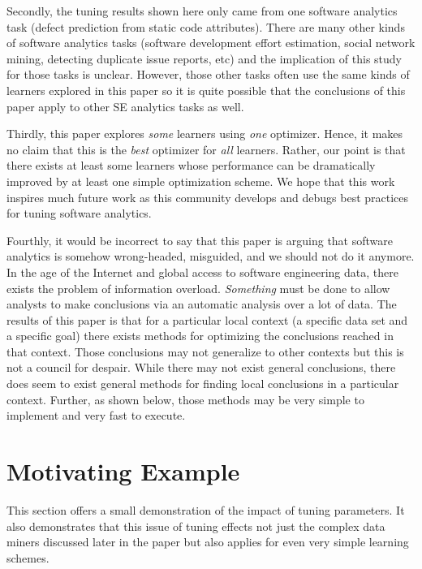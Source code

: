 \documentclass{sig-alternative}
\begin{document}
Secondly, the tuning results shown here only came from one  software analytics task 
(defect prediction from static code attributes).
There are many other kinds of software analytics tasks 
(software development effort estimation, social network mining,
detecting duplicate issue reports, etc) and the implication of this
study for those tasks is unclear. 
However,  those other tasks often use the same kinds of learners
explored in this paper so it is quite possible that
the conclusions of this paper apply to other SE analytics tasks as well. 


Thirdly, this paper explores {\em some} learners using {\em one}  optimizer. Hence, it makes
no claim that this is the {\em best} optimizer for {\em all} learners.
Rather, our point is that there exists at least some learners
whose performance can be dramatically improved by 
at least one simple optimization scheme.  We hope that this work inspires
much future work as this community develops and debugs best practices for tuning
software analytics.

Fourthly, it would be incorrect to say that this paper is arguing that
software analytics is somehow wrong-headed, misguided, and we should not do it anymore.
In the age of the Internet and global access to software engineering data,
there exists the  problem of information overload. {\em Something} must be done to
allow analysts to make conclusions via an automatic analysis over a lot of data.
The results of this paper is that for a particular local context
(a specific data set and a specific goal) there exists  
methods for optimizing the conclusions reached in that context.  Those conclusions
may not generalize to other contexts but this  is not a council for despair. While there may
not exist general conclusions, there does seem to exist general methods for finding
local conclusions in a particular context. Further, as shown below, those
methods may be very simple to implement and very fast to execute.

\section{Motivating Example}\label{sect:eg}

This section offers a small demonstration
of the impact of tuning parameters. It also demonstrates that this issue of tuning effects 
not just the complex data miners discussed later in the paper but also 
applies for even very simple  learning schemes.
\end{document}
